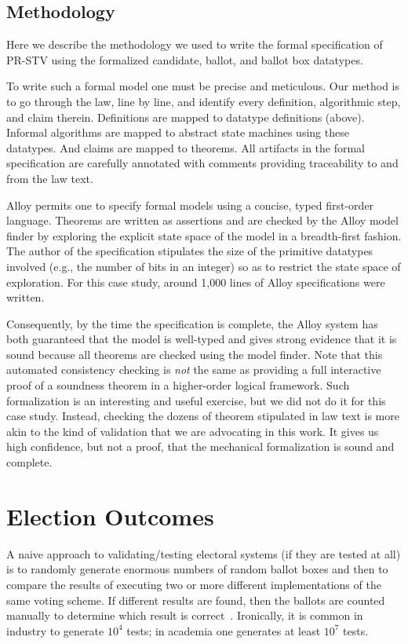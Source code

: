 \documentclass[runningheads,a4paper]{llncs}
\newcommand{\eg}{e.g.,\xspace}
\begin{document}
\subsection{Methodology}

Here we describe the methodology we used to write the formal
specification of PR-STV using the formalized candidate, ballot, and
ballot box datatypes.  

To write such a formal model one must be precise and meticulous.  Our
method is to go through the law, line by line, and identify every
definition, algorithmic step, and claim therein.  Definitions are
mapped to datatype definitions (above).  Informal algorithms are
mapped to abstract state machines using these datatypes.  And claims
are mapped to theorems.  All artifacts in the formal specification are
carefully annotated with comments providing traceability to and from
the law text.

Alloy permits one to specify formal models using a concise, typed
first-order language.  Theorems are written as assertions and are
checked by the Alloy model finder by exploring the explicit state
space of the model in a breadth-first fashion.  The author of the
specification stipulates the size of the primitive datatypes involved
(\eg the number of bits in an integer) so as to restrict the state
space of exploration.  For this case study, around 1,000 lines of
Alloy specifications were written.

Consequently, by the time the specification is complete, the Alloy
system has both guaranteed that the model is well-typed and gives
strong evidence that it is sound because all theorems are checked
using the model finder.  Note that this automated consistency checking
is \emph{not} the same as providing a full interactive proof of a
soundness theorem in a higher-order logical framework.  Such
formalization is an interesting and useful exercise, but we did not do
it for this case study.  Instead, checking the dozens of theorem
stipulated in law text is more akin to the kind of validation that we
are advocating in this work.  It gives us high confidence, but not a
proof, that the mechanical formalization is sound and complete.

\section{Election Outcomes}

A naive approach to validating/testing electoral systems (if they are
tested at all) is to randomly generate enormous numbers of random
ballot boxes and then to compare the results of executing two or more
different implementations of the same voting scheme.  If different
results are found, then the ballots are counted manually to determine
which result is correct~\cite{Coyle2004}.  Ironically, it is common in
industry to generate $10^{4}$ tests; in academia one generates at
least $10^{7}$ tests.
\end{document}
